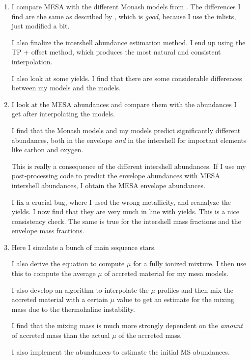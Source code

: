 \documentclass[a4paper,10pt]{article}
\begin{document}
\begin{enumerate}
	      I show here as well that s-process elements only start occuring \emph{after} the first thermal pulse with significant TDU.
	\item[\color{keywordscolor}27.] I compare MESA with the different Monash models from \citet{karakas2016}.
	      The differences I find are the same as described by \citet{rees2024b}, which is \emph{good}, because
	      I use the \citet{rees2024b} inlists, just modified a bit.

	      I also finalize the intershell abundance estimation method.
	      I end up using the TP + offset method, which produces the most natural and consistent interpolation.

	      I also look at some yields.
	      I find that there are some considerable differences between my models
	      and the \citet{karakas2016} models.

	\item[\color{keywordscolor}28.] I look at the MESA abundances and compare them with the abundances I get after interpolating the \citet{karakas2016} models.

	      I find that the Monash models and my models predict significantly different abundances, both in the
	      envelope \emph{and} in the intershell for important elements like carbon and oxygen.

	      This is really a consequence of the different intershell abundances.
	      If I use my post-processing code to predict the envelope abundances with MESA intershell abundances, I obtain the MESA envelope abundances.

	      I fix a crucial bug, where I used the wrong metallicity, and reanalyze the yields.
	      I now find that
	      they are very much in line with \citet{karakas2016} yields.
	      This is a nice consistency check.
	      The same is true for the intershell mass fractions and the envelope mass fractions.
	\item[\color{keywordscolor}29.] Here I simulate a bunch of main sequence stars.

	      I also derive the equation to compute \(\mu \) for a fully ionized mixture.
	      I then use this to compute the average \(\mu \) of accreted material for my mesa models.

	      I also develop an algorithm to interpolate the \(\mu \) profiles and then mix the accreted material
	      with a certain \(\mu \) value to get an estimate for the mixing mass due to the thermohaline
	      instability.

	      I find that the mixing mass is much more strongly dependent on the \emph{amount} of accreted mass
	      than the actual \(\mu \) of the accreted mass.

	      I also implement the \citet{asplund2009} abundances to estimate the initial MS abundances.
\end{enumerate}
\end{document}
